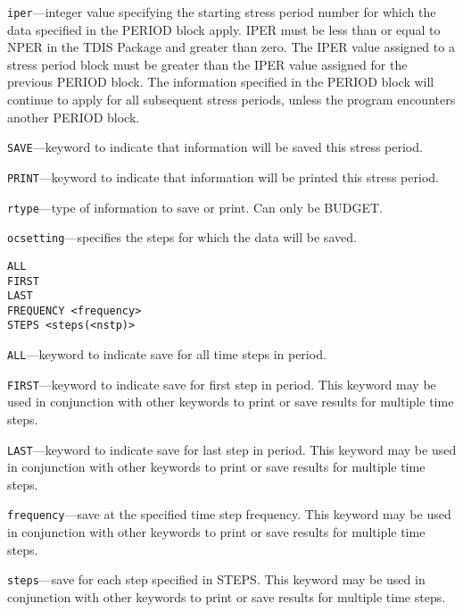 \begin{description}
\item \texttt{iper}---integer value specifying the starting stress period number for which the data specified in the PERIOD block apply.  IPER must be less than or equal to NPER in the TDIS Package and greater than zero.  The IPER value assigned to a stress period block must be greater than the IPER value assigned for the previous PERIOD block.  The information specified in the PERIOD block will continue to apply for all subsequent stress periods, unless the program encounters another PERIOD block.

\item \texttt{SAVE}---keyword to indicate that information will be saved this stress period.

\item \texttt{PRINT}---keyword to indicate that information will be printed this stress period.

\item \texttt{rtype}---type of information to save or print.  Can only be BUDGET.

\item \texttt{ocsetting}---specifies the steps for which the data will be saved.

\begin{lstlisting}[style=blockdefinition]
ALL
FIRST
LAST
FREQUENCY <frequency>
STEPS <steps(<nstp)>
\end{lstlisting}

\item \texttt{ALL}---keyword to indicate save for all time steps in period.

\item \texttt{FIRST}---keyword to indicate save for first step in period. This keyword may be used in conjunction with other keywords to print or save results for multiple time steps.

\item \texttt{LAST}---keyword to indicate save for last step in period. This keyword may be used in conjunction with other keywords to print or save results for multiple time steps.

\item \texttt{frequency}---save at the specified time step frequency. This keyword may be used in conjunction with other keywords to print or save results for multiple time steps.

\item \texttt{steps}---save for each step specified in STEPS. This keyword may be used in conjunction with other keywords to print or save results for multiple time steps.

\end{description}

